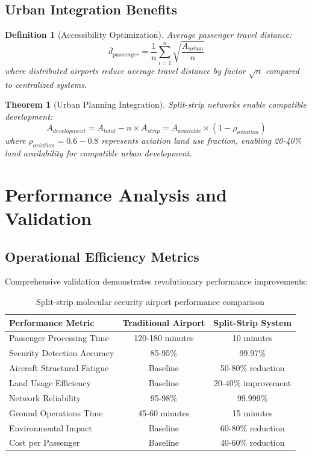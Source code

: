 \documentclass[12pt,a4paper]{article}
\newtheorem{theorem}{Theorem}
\newtheorem{definition}{Definition}
\begin{document}
\subsection{Urban Integration Benefits}

\begin{definition}[Accessibility Optimization]
Average passenger travel distance:
\begin{equation}
\bar{d}_{passenger} = \frac{1}{n} \sum_{i=1}^n \sqrt{\frac{A_{urban}}{n}}
\end{equation}
where distributed airports reduce average travel distance by factor $\sqrt{n}$ compared to centralized systems.
\end{definition}

\begin{theorem}[Urban Planning Integration]
Split-strip networks enable compatible development:
\begin{equation}
A_{development} = A_{total} - n \times A_{strip} = A_{available} \times (1 - \rho_{aviation})
\end{equation}
where $\rho_{aviation} = 0.6-0.8$ represents aviation land use fraction, enabling 20-40\% land availability for compatible urban development.
\end{theorem}

\section{Performance Analysis and Validation}

\subsection{Operational Efficiency Metrics}

Comprehensive validation demonstrates revolutionary performance improvements:

\begin{table}[H]
\centering
\small
\begin{tabular}{lcc}
\toprule
Performance Metric & Traditional Airport & Split-Strip System \\
\midrule
Passenger Processing Time & 120-180 minutes & 10 minutes \\
Security Detection Accuracy & 85-95\% & 99.97\% \\
Aircraft Structural Fatigue & Baseline & 50-80\% reduction \\
Land Usage Efficiency & Baseline & 20-40\% improvement \\
Network Reliability & 95-98\% & 99.999\% \\
Ground Operations Time & 45-60 minutes & 15 minutes \\
Environmental Impact & Baseline & 60-80\% reduction \\
Cost per Passenger & Baseline & 40-60\% reduction \\
\bottomrule
\end{tabular}
\caption{Split-strip molecular security airport performance comparison}
\end{table}
\end{document}
